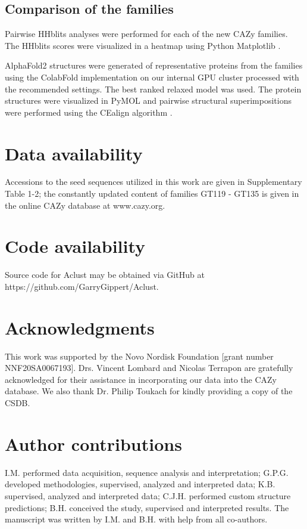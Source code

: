 \documentclass{article}
\begin{document}
\subsection{Comparison of the families}
Pairwise HHblits analyses \cite{remmert_hhblits_2012} were performed for each of the new CAZy families. The HHblits scores were visualized in a heatmap using Python Matplotlib \cite{hunter_matplotlib_2007}.

AlphaFold2 \cite{meeske_seds_2016} structures were generated of representative proteins from the families using the ColabFold  implementation \cite{mirdita_colabfold_2022} on our internal GPU cluster processed with the recommended settings. The best ranked relaxed model was used. The protein structures were visualized in PyMOL \cite{schrodinger_l_pymol_2020} and pairwise structural superimpositions were performed using the CEalign algorithm \cite{shindyalov_protein_1998}.

\section{Data availability}
Accessions to the seed sequences utilized in this work are given in Supplementary Table 1-2; the constantly updated content of families GT119 - GT135 is given in the online CAZy database at www.cazy.org. 

\section{Code availability}
Source code for Aclust may be obtained via GitHub at https://github.com/GarryGippert/Aclust.

\section{Acknowledgments}
This work was supported by the Novo Nordisk Foundation [grant number NNF20SA0067193]. Drs. Vincent Lombard and Nicolas Terrapon are gratefully acknowledged for their assistance in incorporating our data into the CAZy database. We also thank Dr. Philip Toukach for kindly providing a copy of the CSDB. 

\section{Author contributions}
I.M. performed data acquisition, sequence analysis and interpretation; G.P.G. developed methodologies, supervised, analyzed and interpreted data; K.B. supervised, analyzed and interpreted data; C.J.H. performed custom structure predictions; B.H. conceived the study, supervised and interpreted results. The manuscript was written by I.M. and B.H. with help from all co-authors.
\end{document}
